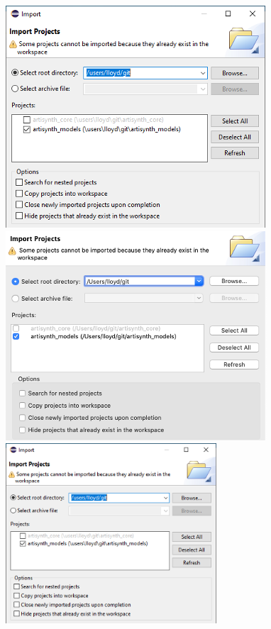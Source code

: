 \begin{figure}
\begin{center}
\iflatexml
  \ifWindows
     \includegraphics[]{images/EclipseImportProjects}
  \else
     \includegraphics[]{images/EclipseImportProjectsMacOS}
  \fi
\else
  \ifWindows
     \includegraphics[width=0.7\textwidth]{images/EclipseImportProjects}

\end{center}
\end{figure}
